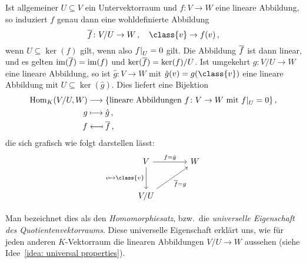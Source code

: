 \begin{remark}
  Ist allgemeiner $U \subseteq V$ ein Untervektorraum und $f \colon V \to W$ eine lineare Abbildung, so induziert $f$ genau dann eine wohldefinierte Abbildung
  \[
            \induced{f}
    \colon  V\!/U
    \to     W \,,
    \quad   \class{v}
    \to     f(v) \,,
  \]
  wenn $U \subseteq \ker(f)$ gilt, wenn also $\restrict{f}{U} = 0$ gilt.
  Die Abbildung $\overline{f}$ ist dann linear, und es gelten $\operatorname{im}(\overline{f}) = \operatorname{im}(f)$ und $\ker(\overline{f}) = \ker(f)/U$.
  Ist umgekehrt $g \colon V\!/U \to W$ eine lineare Abbildung, so ist $\hat{g} \colon V \to W$ mit $\hat{g}(v) = g(\class{v})$ eine lineare Abbildung mit $U \subseteq \ker(\hat{g})$.
  Dies liefert eine Bijektion
  \begin{align*}
                      \Hom_K(V/U,W)
    &\longrightarrow  \{ \text{lineare Abbildungen $f \colon V \to W$ mit $\restrict{f}{U}= 0$} \} \,,
    \\
                      g
    &\longmapsto      \hat{g} \,,
    \\
                      f
    &\longmapsfrom    \induced{f} \,,
  \end{align*}
  die sich grafisch wie folgt darstellen lässt:
  \[
    \begin{tikzcd}[sep = large]
        V
        \arrow{r}[above]{f = \hat{g}}
        \arrow{d}[left]{v \mapsto \class{v}}
      & W
      \\
        V\!/U
        \arrow{ru}[below right]{\induced{f} = g}
      & {}
    \end{tikzcd}
  \]

  Man bezeichnet dies als den \emph{Homomorphiesatz}, bzw.\ die \emph{universelle Eigenschaft des Quotientenvektorraums}.
  Diese universelle Eigenschaft erklärt uns, wie für jeden anderen $K$-Vektorraum die linearen Abbildungen $V\!/U \to W$ aussehen (siehe Idee~\ref{idea: universal properties}).
\end{remark}

